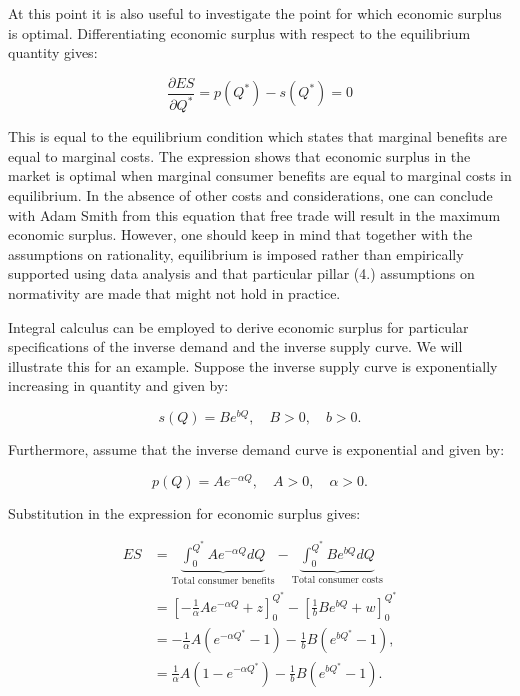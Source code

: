 \documentclass[
]{book}
\begin{document}
At this point it is also useful to investigate the point for which economic surplus is optimal. Differentiating economic surplus with respect to the equilibrium quantity gives:

\begin{equation}
\frac{\partial ES}{\partial Q^\ast} = p(Q^\ast) - s(Q^\ast) = 0
\end{equation}

This is equal to the equilibrium condition which states that marginal benefits are equal to marginal costs. The expression shows that economic surplus in the market is optimal when marginal consumer benefits are equal to marginal costs in equilibrium. In the absence of other costs and considerations, one can conclude with Adam Smith from this equation that free trade will result in the maximum economic surplus. However, one should keep in mind that together with the assumptions on rationality, equilibrium is imposed rather than empirically supported using data analysis and that particular pillar (4.) assumptions on normativity are made that might not hold in practice.

Integral calculus can be employed to derive economic surplus for particular specifications of the inverse demand and the inverse supply curve. We will illustrate this for an example. Suppose the inverse supply curve is exponentially increasing in quantity and given by:

\begin{equation}
s(Q) = B e^{bQ}, \quad B>0, \quad b >0.
\end{equation}

Furthermore, assume that the inverse demand curve is exponential and given by:

\begin{equation}
p(Q) = Ae^{-\alpha Q}, \quad A>0, \quad \alpha >0.
\end{equation}

Substitution in the expression for economic surplus gives:

\begin{align}
ES &= \underbrace{\int_0^{Q^\ast} Ae^{-\alpha Q} dQ}_\text{Total consumer benefits} - \underbrace{\int^{Q^\ast}_0  B e^{bQ}dQ}_\text{Total consumer costs}\\
&= \left[-\frac{1}{\alpha}Ae^{-\alpha Q} + z\right]^{Q^\ast}_0 -  \left[\frac{1}{b}B e^{bQ} + w\right]^{Q^\ast}_0 \\
&= -\frac{1}{\alpha}A\left(e^{-\alpha Q^\ast} - 1 \right) -\frac{1}{b}B\left(e^{b Q^\ast} - 1 \right),\\
&= \frac{1}{\alpha}A\left(1 - e^{-\alpha Q^\ast} \right) -\frac{1}{b}B\left(e^{b Q^\ast} - 1 \right).
\end{align}
\end{document}
